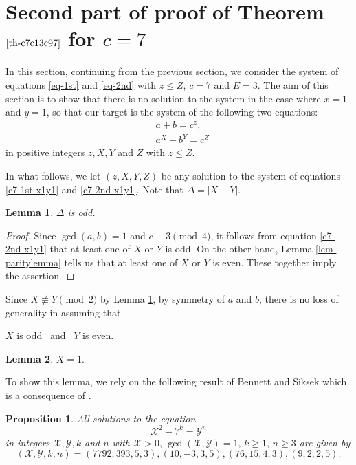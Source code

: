 \documentclass[11pt]{amsart}
\newtheorem{lem}{Lemma}[section]
\newtheorem{prop}{Proposition}[section]
\numberwithin{equation}{section}
\begin{document}
\section{Second part of proof of Theorem $\ref{th-c7c13c97}$ for  $c=7$} \label{sec-7}

In this section, continuing from the previous section, we consider the system of equations \eqref{eq-1st} and \eqref{eq-2nd} with $z \le Z$, $c=7$ and $E=3$.
The aim of this section is to show that there is no solution to the system in the case where $x=1$ and $y=1$, so that our target is the system of the following two equations:
\begin{eqnarray}
&a+b=c^z, \label{c7-1st-x1y1}\\
&a^X+b^Y=c^Z \label{c7-2nd-x1y1}
\end{eqnarray}
in positive integers $z, X, Y$ and $Z$ with $z \le Z$.

In what follows, we let $(z,X,Y,Z)$ be any solution to the system of equations \eqref{c7-1st-x1y1} and \eqref{c7-2nd-x1y1}.
Note that $\Delta=|X-Y|$.

\begin{lem} \label{lem-deltaodd}
$\Delta$ is odd.
\end{lem}

\begin{proof}
Since $\gcd(a,b)=1$ and $c \equiv 3 \pmod{4}$, it follows from equation \eqref{c7-2nd-x1y1} that at least one of $X$ or $Y$ is odd.
On the other hand, Lemma \ref{lem-paritylemma} tells us that at least one of $X$ or $Y$ is even.
These together imply the assertion.
\end{proof}

Since $X \not\equiv Y \pmod{2}$ by Lemma \ref{lem-deltaodd}, by symmetry of $a$ and $b$, there is no loss of generality in assuming that 
\begin{center}
$X$ is odd \ and \ $Y$ is even.
\end{center}

\begin{lem}\label{c7-lem-X1}
$X=1.$
\end{lem}

To show this lemma, we rely on the following result of Bennett and Siksek which is a consequence of \cite[Theorems 2 and 5;\,$q=7$]{BS}.
\begin{prop}\label{prop-BS-q7}
All solutions to the equation
\[
\mathcal X^2 - 7^k = \mathcal Y^n
\]
in integers $\mathcal X,\mathcal Y,k$ and $n$ with $\mathcal X>0,\,\gcd(\mathcal X,\mathcal Y)=1, \,k \ge 1, \,n \ge 3$ are given by 
\[
(\mathcal X,\mathcal Y,k,n)=(7792,393,5,3),(10,-3,3,5),(76,15,4,3),(9,2,2,5).
\]
\end{prop}
\end{document}
